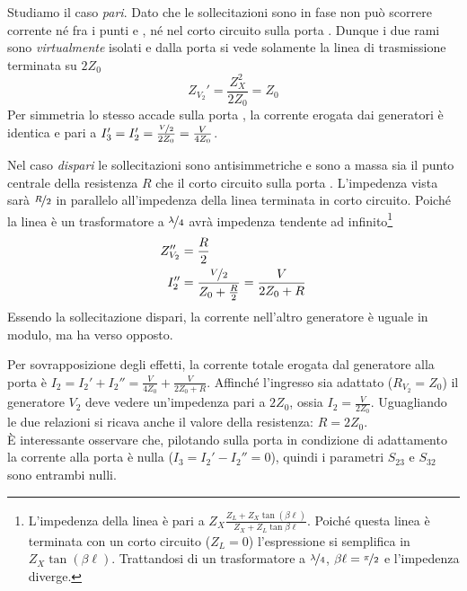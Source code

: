 Studiamo il caso \textit{pari}. Dato che le sollecitazioni sono in fase non può scorrere corrente né fra i punti  e , né nel corto circuito sulla porta . Dunque i due rami sono \textit{virtualmente} isolati e dalla porta  si vede solamente la linea di trasmissione terminata su $2Z_0$
\[
Z_{V_2}' = \frac{Z_X^2}{2Z_0} = Z_0
\]
Per simmetria lo stesso accade sulla porta , la corrente erogata dai generatori è identica e pari a $I_3' = I_2' = \frac{\nicefrac{V}{2}}{2Z_0} = \frac{V}{4Z_0}$.

Nel caso \textit{dispari} le sollecitazioni sono antisimmetriche e sono a massa sia il punto centrale della resistenza $R$ che il corto circuito sulla porta . L'impedenza vista sarà $\nicefrac{R}{2}$ in parallelo all'impedenza della linea terminata in corto circuito. Poiché la linea è un trasformatore a $\nicefrac{\lambda}{4}$ avrà impedenza tendente ad infinito\footnote{L'impedenza della linea è pari a $Z_X \frac{Z_L + Z_X\tan(\beta\ell)}{Z_X + Z_L\tan{\beta\ell}}$. Poiché questa linea è terminata con un corto circuito ($Z_L = 0$) l'espressione si semplifica in  $Z_X\tan(\beta\ell)$. Trattandosi di un trasformatore a $\nicefrac{\lambda}{4}$, $\beta\ell = \nicefrac{\pi}{2}$ e l'impedenza diverge.}
\begin{align*}
Z_{V_2}'' &= \frac{R}{2}
\\
I_2'' &= \frac{\nicefrac{V}{2}}{Z_0+\frac{R}{2}} = \frac{V}{2Z_0+R}
\end{align*}
Essendo la sollecitazione dispari, la corrente nell'altro generatore è uguale in modulo, ma ha verso opposto.

Per sovrapposizione degli effetti, la corrente totale erogata dal generatore alla porta  è $I_2= I_2'+I_2''=\frac{V}{4Z_0}+\frac{V}{2Z_0+R}$. Affinché l'ingresso sia adattato ($R_{V_2} = Z_0$) il generatore $V_2$ deve vedere un'impedenza pari a $2Z_0$, ossia $I_2=\frac{V}{2Z_0}$. Uguagliando le due relazioni si ricava anche il valore della resistenza: $R=2Z_0$.\\
È interessante osservare che, pilotando sulla porta  in condizione di adattamento la corrente alla porta  è nulla ($I_3 = I_2'-I_2'' = 0$), quindi i parametri $S_{23}$ e $S_{32}$ sono entrambi nulli.

